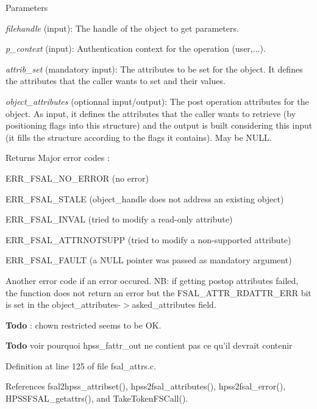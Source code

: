 \begin{DoxyParams}{Parameters}
\item[{\em filehandle}](input): The handle of the object to get parameters. \item[{\em p\_\-context}](input): Authentication context for the operation (user,...). \item[{\em attrib\_\-set}](mandatory input): The attributes to be set for the object. It defines the attributes that the caller wants to set and their values. \item[{\em object\_\-attributes}](optionnal input/output): The post operation attributes for the object. As input, it defines the attributes that the caller wants to retrieve (by positioning flags into this structure) and the output is built considering this input (it fills the structure according to the flags it contains). May be NULL.\end{DoxyParams}
\begin{DoxyReturn}{Returns}
Major error codes :
\begin{DoxyItemize}
\item ERR\_\-FSAL\_\-NO\_\-ERROR (no error)
\item ERR\_\-FSAL\_\-STALE (object\_\-handle does not address an existing object)
\item ERR\_\-FSAL\_\-INVAL (tried to modify a read-\/only attribute)
\item ERR\_\-FSAL\_\-ATTRNOTSUPP (tried to modify a non-\/supported attribute)
\item ERR\_\-FSAL\_\-FAULT (a NULL pointer was passed as mandatory argument)
\item Another error code if an error occured. NB: if getting postop attributes failed, the function does not return an error but the FSAL\_\-ATTR\_\-RDATTR\_\-ERR bit is set in the object\_\-attributes-\/$>$asked\_\-attributes field. 
\end{DoxyItemize}
\end{DoxyReturn}


\begin{Desc}
\item[{\bf Todo}]: chown restricted seems to be OK. \end{Desc}


\begin{Desc}
\item[{\bf Todo}]voir pourquoi hpss\_\-fattr\_\-out ne contient pas ce qu'il devrait contenir \end{Desc}


Definition at line 125 of file fsal\_\-attrs.c.

References fsal2hpss\_\-attribset(), hpss2fsal\_\-attributes(), hpss2fsal\_\-error(), HPSSFSAL\_\-getattrs(), and TakeTokenFSCall().